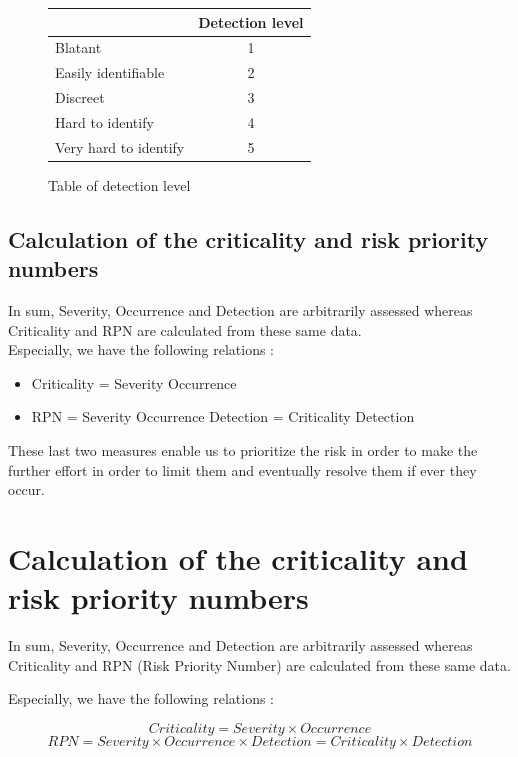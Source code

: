 \begin{figure}[h]
    \centering
    \begin{tabular}{| p{4cm} | c |}
        \hline
        \rowcolor{heading-color}\multicolumn{1}{|c|}{Detection definition} & Detection level\\
        \hline
        Blatant & 1  \\
        \hline
        Easily identifiable & 2  \\
        \hline
        Discreet & 3  \\
        \hline
        Hard to identify & 4 \\
        \hline
        Very  hard to identify & 5 \\
        \hline
    \end{tabular}
    \caption{Table of detection level}
\end{figure}

\subsection{Calculation of the criticality and risk priority numbers}

In sum, Severity, Occurrence and Detection are arbitrarily assessed whereas Criticality and RPN are calculated from these same data.\\

Especially, we have the following relations :
\begin{itemize}
    \item Criticality = Severity \* Occurrence
    \item RPN = Severity \* Occurrence \* Detection = Criticality \* Detection
\end{itemize}

These last two measures enable us to prioritize the risk in order to make the further effort in order to limit them and eventually resolve them if ever they occur.

\section{Calculation of the criticality and risk priority numbers}

In sum, Severity, Occurrence and Detection are arbitrarily assessed
whereas Criticality and RPN (Risk Priority Number) are calculated from these same data.

Especially, we have the following relations :

\[Criticality = Severity \times Occurrence\]
\[RPN = Severity \times Occurrence \times Detection = Criticality \times Detection\]

